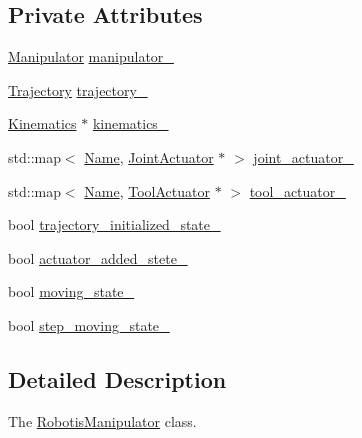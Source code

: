 \subsection*{Private Attributes}
\begin{DoxyCompactItemize}
\item 
\hyperlink{classrobotis__manipulator_1_1_manipulator}{Manipulator} \hyperlink{classrobotis__manipulator_1_1_robotis_manipulator_a5b2df4a3b3ee7f408cb1d0eaf61644dc}{manipulator\+\_\+}
\item 
\hyperlink{classrobotis__manipulator_1_1_trajectory}{Trajectory} \hyperlink{classrobotis__manipulator_1_1_robotis_manipulator_a992d2c7221bcaab8e9a688d12728d738}{trajectory\+\_\+}
\item 
\hyperlink{classrobotis__manipulator_1_1_kinematics}{Kinematics} $\ast$ \hyperlink{classrobotis__manipulator_1_1_robotis_manipulator_a9a37fd068504dfe5fab346884790fc8f}{kinematics\+\_\+}
\item 
std\+::map$<$ \hyperlink{namespacerobotis__manipulator_a08c2d25e77a01ad75b9bb740f8ce4765}{Name}, \hyperlink{classrobotis__manipulator_1_1_joint_actuator}{Joint\+Actuator} $\ast$ $>$ \hyperlink{classrobotis__manipulator_1_1_robotis_manipulator_a54dfb941bb2682d321daea25a373ab1c}{joint\+\_\+actuator\+\_\+}
\item 
std\+::map$<$ \hyperlink{namespacerobotis__manipulator_a08c2d25e77a01ad75b9bb740f8ce4765}{Name}, \hyperlink{classrobotis__manipulator_1_1_tool_actuator}{Tool\+Actuator} $\ast$ $>$ \hyperlink{classrobotis__manipulator_1_1_robotis_manipulator_a9d472875a989092466257d14dff2bdcf}{tool\+\_\+actuator\+\_\+}
\item 
bool \hyperlink{classrobotis__manipulator_1_1_robotis_manipulator_a6ffca122bf46d7d3bd130cbd7ac9f0e4}{trajectory\+\_\+initialized\+\_\+state\+\_\+}
\item 
bool \hyperlink{classrobotis__manipulator_1_1_robotis_manipulator_a02073b7982b992642b28acfa35a17769}{actuator\+\_\+added\+\_\+stete\+\_\+}
\item 
bool \hyperlink{classrobotis__manipulator_1_1_robotis_manipulator_a5b7990548dd779b1ca66a2ad83a74f76}{moving\+\_\+state\+\_\+}
\item 
bool \hyperlink{classrobotis__manipulator_1_1_robotis_manipulator_aef8766eb10814f57928dcd9e71ceaccf}{step\+\_\+moving\+\_\+state\+\_\+}
\end{DoxyCompactItemize}


\subsection{Detailed Description}
The \hyperlink{classrobotis__manipulator_1_1_robotis_manipulator}{Robotis\+Manipulator} class. 

